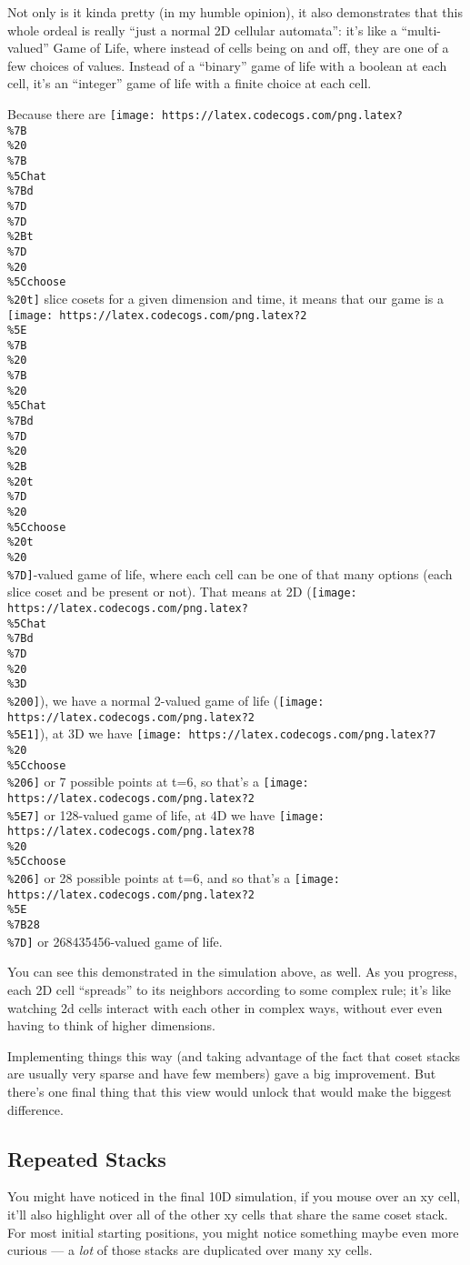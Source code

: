 \documentclass[]{article}
\begin{document}
Not only is it kinda pretty (in my humble opinion), it also demonstrates that
this whole ordeal is really ``just a normal 2D cellular automata'': it's like a
``multi-valued'' Game of Life, where instead of cells being on and off, they are
one of a few choices of values. Instead of a ``binary'' game of life with a
boolean at each cell, it's an ``integer'' game of life with a finite choice at
each cell.

Because there are
\texttt{[image: https://latex.codecogs.com/png.latex?\\\%7B\\\%20\\\%7B\\\%5Chat\\\%7Bd\\\%7D\\\%7D\\\%2Bt\\\%7D\\\%20\\\%5Cchoose\\\%20t]}
slice cosets for a given dimension and time, it means that our game is a
\texttt{[image: https://latex.codecogs.com/png.latex?2\\\%5E\\\%7B\\\%20\\\%7B\\\%20\\\%5Chat\\\%7Bd\\\%7D\\\%20\\\%2B\\\%20t\\\%7D\\\%20\\\%5Cchoose\\\%20t\\\%20\\\%7D]}-valued
game of life, where each cell can be one of that many options (each slice coset
and be present or not). That means at 2D
(\texttt{[image: https://latex.codecogs.com/png.latex?\\\%5Chat\\\%7Bd\\\%7D\\\%20\\\%3D\\\%200]}),
we have a normal 2-valued game of life
(\texttt{[image: https://latex.codecogs.com/png.latex?2\\\%5E1]}), at 3D we have
\texttt{[image: https://latex.codecogs.com/png.latex?7\\\%20\\\%5Cchoose\\\%206]} or 7
possible points at t=6, so that's a
\texttt{[image: https://latex.codecogs.com/png.latex?2\\\%5E7]} or 128-valued game
of life, at 4D we have
\texttt{[image: https://latex.codecogs.com/png.latex?8\\\%20\\\%5Cchoose\\\%206]} or
28 possible points at t=6, and so that's a
\texttt{[image: https://latex.codecogs.com/png.latex?2\\\%5E\\\%7B28\\\%7D]} or
268435456-valued game of life.

You can see this demonstrated in the simulation above, as well. As you progress,
each 2D cell ``spreads'' to its neighbors according to some complex rule; it's
like watching 2d cells interact with each other in complex ways, without ever
even having to think of higher dimensions.

Implementing things this way (and taking advantage of the fact that coset stacks
are usually very sparse and have few members) gave a big improvement. But
there's one final thing that this view would unlock that would make the biggest
difference.

\hypertarget{repeated-stacks}{%
\subsection{Repeated Stacks}\label{repeated-stacks}}

You might have noticed in the final 10D simulation, if you mouse over an xy
cell, it'll also highlight over all of the other xy cells that share the same
coset stack. For most initial starting positions, you might notice something
maybe even more curious --- a \emph{lot} of those stacks are duplicated over
many xy cells.
\end{document}
